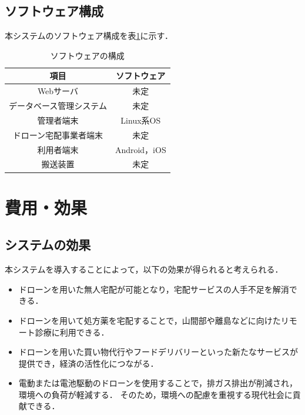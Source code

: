 \documentclass[a4paper, titlepage]{jsarticle}
\begin{document}
\subsection{ソフトウェア構成}
本システムのソフトウェア構成を表\ref{fig:software}に示す．
\begin{table}[H]
        \begin{center}
                \caption{ソフトウェアの構成}
                \label{fig:software}
                \begin{tabular}{cc} \hline
                        項目           & ソフトウェア      \\ \hline \hline
                        Webサーバ       & 未定          \\
                        データベース管理システム & 未定          \\
                        管理者端末        & Linux系OS    \\
                        ドローン宅配事業者端末  & 未定          \\
                        利用者端末        & Android，iOS \\
                        搬送装置         & 未定          \\ \hline
                \end{tabular}
        \end{center}
\end{table}

\section{費用・効果}
\subsection{システムの効果}
本システムを導入することによって，以下の効果が得られると考えられる．
\begin{itemize}
  \item ドローンを用いた無人宅配が可能となり，宅配サービスの人手不足を解消できる．
  \item ドローンを用いて処方薬を宅配することで，山間部や離島などに向けたリモート診療に利用できる．
  \item ドローンを用いた買い物代行やフードデリバリーといった新たなサービスが提供でき，経済の活性化につながる．
  \item 電動または電池駆動のドローンを使用することで，排ガス排出が削減され，環境への負荷が軽減する．
  そのため，環境への配慮を重視する現代社会に貢献できる．
\end{itemize}
\end{document}
